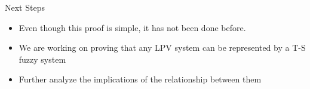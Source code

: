 \begin{frame}{Next Steps}
    \begin{itemize}
        \item Even though this proof is simple, it has not been done before.
        \item We are working on proving that any LPV system can be represented by a T-S fuzzy system 
        \item Further analyze the implications of the relationship between them
    \end{itemize}
\end{frame}



	
	

